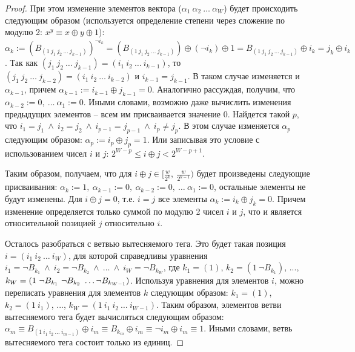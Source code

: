 \begin{proof}
  При этом изменение элементов вектора
  ($\alpha_1~\alpha_2~\dots~\alpha_W$) будет происходить следующим
  образом (используется определение степени через сложение по модулю
  2: $x^y \equiv x \oplus y \oplus 1$): $\alpha_k :=
  (B_{(1~j_1~j_2~\dots~j_{k-1})})^{\neg i_k} =
  (B_{(1~j_1~j_2~\dots~j_{k-1})}) \oplus (\neg i_k) \oplus 1 =
  B_{(1~j_1~j_2~\dots~j_{k-1})} \oplus i_k = j_k \oplus i_k$. Так
  как $(j_1~j_2~\dots~j_{k-1}) = (i_1~i_2~\dots~i_{k-1})$, то
  $(j_1~j_2~\dots~j_{k-2}) = (i_1~i_2~\dots~i_{k-2})$ и $i_{k-1} =
  j_{k-1}$. В таком случае изменяется и $\alpha_{k-1}$, причем
  $\alpha_{k-1} := i_{k-1} \oplus j_{k-1} = 0$. Аналогично
  рассуждая, получим, что $\alpha_{k-2} := 0,~\dots~\alpha_1 := 0$.
  Иными словами, возможно даже вычислить изменения предыдущих
  элементов -- всем им присваивается значение 0. Найдется такой $p$,
  что $i_1 = j_1~\wedge~i_2 = j_2~\wedge~i_{p-1} =
  j_{p-1}~\wedge~i_p \neq j_p$. В этом случае изменяется
  $\alpha_p$ следующим образом: $\alpha_p := i_p \oplus j_p = 1$.
  Или записывая это условие с использованием чисел $i$ и $j$: $2^{W-p} \leqslant i
  \oplus j < 2^{W-p+1}$.

  Таким образом, получаем, что для $i \oplus j \in
  [\frac{w}{2^k},~\frac{w}{2^{k-1}})$ будет произведены следующие
  присваивания: $\alpha_k := 1,~\alpha_{k-1} := 0,~\alpha_{k-2} :=
  0,~\dots~\alpha_1 := 0$, остальные элементы не будут изменены. Для
  $i \oplus j = 0$, т.е. $i = j$ все элементы $\alpha_k := i_k \oplus
  j_k = 0$. Причем изменение определяется только суммой по модулю 2
  чисел $i$ и $j$, что и является относительной позицией $j$
  относительно $i$.

  Осталось разобраться с ветвью вытесняемого тега. Это будет такая
  позиция $i = (i_1~i_2~\dots~i_W)$, для которой справедливы
  уравнения $i_1 = \neg B_{k_1}~\wedge~i_2 = \neg
  B_{k_2}~\wedge~\dots~\wedge~i_W = \neg B_{k_W}$, где $k_1 = (1)$,
  $k_2 = (1~\neg B_{k_1})$, ..., $k_W = (1~\neg B_{k_1}~\neg
  B_{k_2}~\dots\\\neg B_{k_{W-1}})$. Используя уравнения для
  элементов $i$, можно переписать уравнения для элементов $k$
  следующим образом: $k_1 = (1)$,
  $k_2 = (1~i_1)$, ..., $k_W = (1~i_1~i_2~\dots~i_{W-1})$. Таким
  образом, элементов ветви вытесняемого тега будет вычисляться
  следующим образом: $\alpha_m \equiv B_{(1~i_1~i_2~\dots~i_{m-1})}
  \oplus i_m \equiv B_{k_m} \oplus i_m \equiv \neg i_m \oplus i_m
  \equiv 1$. Иными словами, ветвь вытесняемого тега состоит только
  из единиц.
\end{proof}


